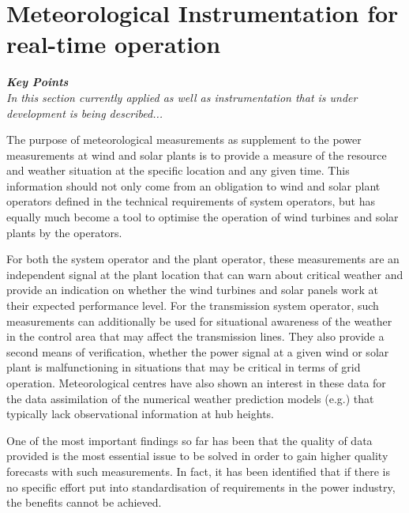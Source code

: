 \chapter{Meteorological Instrumentation for real-time operation 
}
    \label{ch:instrumentation}
{\color{magenta}{Contributing author: COM, JB}}

\noindent
\begin{tcolorbox}
\parbox{\textwidth}{
\emph{\textbf{Key Points}\\
In this section currently applied as well as instrumentation that is under development is being described... 
}}
\end{tcolorbox}

The purpose of meteorological measurements as supplement to the power measurements at wind and solar plants is to provide a measure of the resource and weather situation at the specific location and any given time. This information should not only come from an obligation to wind and solar plant operators defined in the technical requirements of system operators, but has equally much become a tool to optimise the operation of wind turbines and solar plants by the operators.

For both the system operator and the plant operator, these measurements are an independent signal at the plant location that can warn about critical weather and provide an indication on whether the wind turbines and solar panels work at their expected performance level. For the transmission system operator, such measurements can additionally be used for situational awareness of the weather in the control area that may affect the transmission lines. They also provide a second means of verification, whether the power signal at a given wind or solar plant is malfunctioning in situations that may be critical in terms of grid operation.
Meteorological centres have also shown an interest in these data for the data assimilation of the numerical weather prediction models (e.g.\citep{Marquis2012,EWeLINE2011}) that typically lack observational information at hub heights. 

One of the most important findings so far has been that the quality of data provided is the most essential issue to be solved in order to gain higher quality forecasts with such measurements. In fact, it has been identified that if there is no specific effort put into standardisation of requirements in the power industry, the benefits cannot be achieved.


